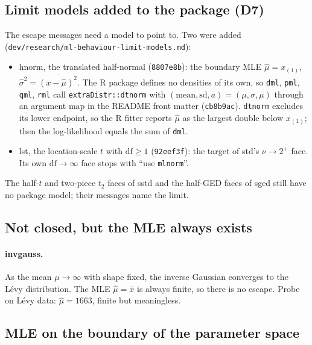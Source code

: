 \documentclass[11pt]{article}
\newcommand{\code}[1]{\texttt{#1}}
\theoremstyle{plain}
\theoremstyle{definition}
\theoremstyle{remark}
\begin{document}
\subsection{Limit models added to the package (D7)}

The escape messages need a model to point to. Two were added
(\code{dev/research/ml-behaviour-limit-models.md}):
\begin{itemize}
  \item hnorm, the translated half-normal (\code{8807e8b}): the boundary MLE
    $\hat\mu = x_{(1)}$, $\hat\sigma^2 = \overline{(x-\hat\mu)^2}$. The R
    package defines no densities of its own, so \code{dml}, \code{pml},
    \code{qml}, \code{rml} call \code{extraDistr::dtnorm} with
    $(\text{mean}, \text{sd}, a) = (\mu, \sigma, \mu)$ through an argument
    map in the README front matter (\code{cb8b9ac}). \code{dtnorm} excludes
    its lower endpoint, so the R fitter reports $\hat\mu$ as the largest
    double below $x_{(1)}$; then the log-likelihood equals the sum of
    \code{dml}.
  \item lst, the location-scale $t$ with $\mathrm{df} \ge 1$
    (\code{92eef3f}): the target of std's $\nu\to2^+$ face. Its own
    $\mathrm{df}\to\infty$ face stops with ``use \code{mlnorm}''.
\end{itemize}
The half-$t$ and two-piece $t_2$ faces of sstd and the half-GED faces of
sged still have no package model; their messages name the limit.

\subsection{Not closed, but the MLE always exists}\label{sec:exists}

\paragraph{invgauss.} As the mean $\mu\to\infty$ with shape fixed, the
inverse Gaussian converges to the L\'evy distribution. The MLE
$\hat\mu = \bar x$ is always finite, so there is no escape. Probe on L\'evy
data: $\hat\mu = 1663$, finite but meaningless.

\subsection{MLE on the boundary of the parameter space}
\end{document}
